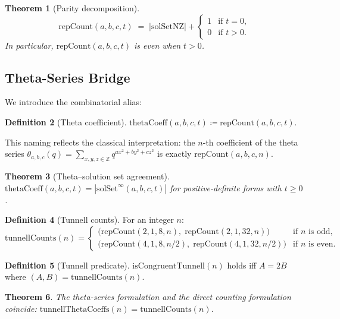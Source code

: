 \documentclass[11pt,a4paper]{article}
\newtheorem{theorem}{Theorem}[section]
\theoremstyle{definition}
\newtheorem{definition}[theorem]{Definition}
\newcommand{\Z}{\mathbb{Z}}
\newcommand{\repCount}{\mathrm{repCount}}
\newcommand{\solSetInf}{\mathrm{solSet}^{\infty}}
\begin{document}
\begin{theorem}[Parity decomposition]\label{thm:parity}
\[
  \repCount(a,b,c,t) \;=\;
  |\mathrm{solSetNZ}| + \begin{cases} 1 & \text{if } t = 0,\\ 0 & \text{if } t > 0.\end{cases}
\]
In particular, $\repCount(a,b,c,t)$ is even when $t > 0$.
\end{theorem}

\subsection{Theta-Series Bridge}\label{sec:s5}

We introduce the combinatorial alias:

\begin{definition}[Theta coefficient]
$\mathrm{thetaCoeff}(a,b,c,t) \coloneqq \repCount(a,b,c,t)$.
\end{definition}

This naming reflects the classical interpretation: the $n$-th
coefficient of the theta series
$\theta_{a,b,c}(q) = \sum_{x,y,z \in \Z} q^{ax^2+by^2+cz^2}$
is exactly $\repCount(a,b,c,n)$.

\begin{theorem}[Theta--solution set agreement]\label{thm:theta-sol}
$\mathrm{thetaCoeff}(a,b,c,t) = |\solSetInf(a,b,c,t)|$ for
positive-definite forms with $t \ge 0$.
\end{theorem}

\begin{definition}[Tunnell counts]\label{def:tunnell-counts}
For an integer $n$:
\[
  \mathrm{tunnellCounts}(n) =
  \begin{cases}
    \bigl(\repCount(2,1,8,n),\; \repCount(2,1,32,n)\bigr)
      & \text{if } n \text{ is odd},\\[4pt]
    \bigl(\repCount(4,1,8,n/2),\; \repCount(4,1,32,n/2)\bigr)
      & \text{if } n \text{ is even}.
  \end{cases}
\]
\end{definition}

\begin{definition}[Tunnell predicate]\label{def:tunnell-pred}
$\mathrm{isCongruentTunnell}(n)$ holds iff $A = 2B$ where
$(A, B) = \mathrm{tunnellCounts}(n)$.
\end{definition}

\begin{theorem}\label{thm:theta-tunnell}
The theta-series formulation and the direct counting formulation
coincide: $\mathrm{tunnellThetaCoeffs}(n) = \mathrm{tunnellCounts}(n)$.
\end{theorem}
\end{document}
